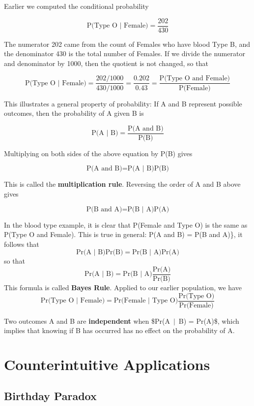 \documentclass[
]{book}
\begin{document}
Earlier we computed the conditional probability

\[
\mbox{P(Type O | Female)} = \frac{202}{430} 
\]

The numerator 202 came from the count of Females who have blood Type B, and the denominator 430 is the total number of Females.
If we divide the numerator and denominator by 1000, then the quotient is not changed, so that

\[
\mbox{P(Type O | Female)} = \frac{202/1000}{430/1000} 
= \frac{0.202}{0.43} = \frac{\mbox{P(Type O and Female)}}{\mbox{P(Female)}}
\]

This illustrates a general property of probability: If A and B represent possible outcomes, then the probability of A given B is

\[
\mbox{P(A | B)} = \frac{\mbox{P(A and B)}}{\mbox{P(B)}}
\]

Multiplying on both sides of the above equation by P(B) gives

\[
\mbox{P(A and B)} = \mbox{P(A | B)}\mbox{P(B)}  
\]

This is called the \textbf{multiplication rule}. Reversing the order of A and B above gives

\[
\mbox{P(B and A)} = \mbox{P(B | A)}\mbox{P(A)}  
\]

In the blood type example, it is clear that P(Female and Type O) is the same as P(Type O and Female).
This is true in general: P(A and B) = P(B and A)\}, it follows that
\[
\mbox{Pr(A $|$ B)}\mbox{Pr(B)}  = \mbox{Pr(B $|$ A)}\mbox{Pr(A)} 
\]
so that
\[
\mbox{Pr(A $|$ B)}  = \mbox{Pr(B $|$ A)}\frac{\mbox{Pr(A)}}{\mbox{Pr(B)}}
\]
This formula is called \textbf{Bayes Rule}. Applied to our earlier population, we have
\[
\mbox{Pr(Type O $|$ Female)} = \mbox{Pr(Female $|$ Type O)}\frac{\mbox{Pr(Type O)}}{\mbox{Pr(Female)}}
\]

Two outcomes A and B are \textbf{independent} when \$\mbox{Pr(A $|$ B)} = \mbox{Pr(A)}\$,
which implies that knowing if B has occurred has no effect on the probability of A.

\hypertarget{counterintuitive-applications}{%
\chapter{Counterintuitive Applications}\label{counterintuitive-applications}}

\hypertarget{birthday-paradox}{%
\section{Birthday Paradox}\label{birthday-paradox}}
\end{document}
